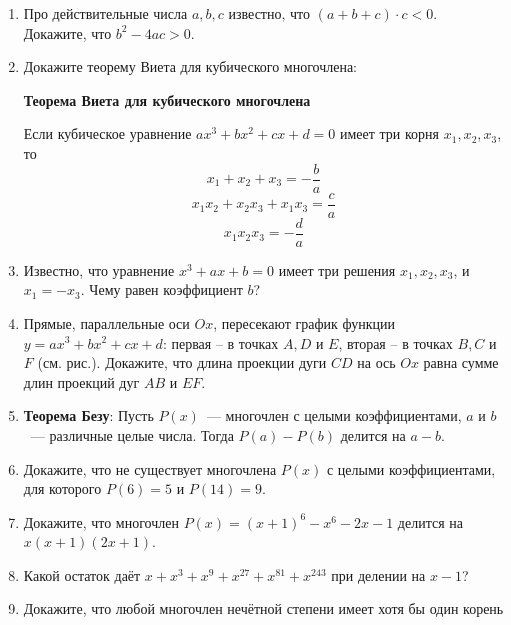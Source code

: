 \documentclass{article}
\begin{document}
\begin{enumerate}[label*=\protect\fbox{\arabic{enumi}}]
\item Про действительные числа $a, b, c$ известно, что $(a + b + c)\cdot c < 0$. Докажите, что $b^2 - 4ac>0$.

\newpage
\item Докажите теорему Виета для кубического многочлена:

\textbf{Теорема Виета для кубического многочлена} 

Если кубическое уравнение $ax^3 + bx^2 + cx + d = 0$ имеет три корня $x_1, x_2, x_3$, то $$x_1 + x_2 + x_3 = -\dfrac{b}{a}$$ $$x_1x_2  + x_2x_3 + x_1x_3 = \dfrac{c}{a}$$ $$x_1x_2x_3 = -\dfrac{d}{a}$$

\item Известно, что уравнение  $x^3 + ax + b = 0$  имеет три решения $x_1, x_2, x_3$, и $x_1 = -x_3$. Чему равен коэффициент $b$?

\item Прямые, параллельные оси $Ox$, пересекают график функции  $y = ax^3 + bx^2 + cx + d$:  первая – в точках $A, D$ и $E$, вторая – в точках $B, C$ и $F$ (см. рис.). Докажите, что длина проекции дуги $CD$ на ось $Ox$ равна сумме длин проекций дуг $AB$ и $EF$.
\begin{figure}[h]
	\label{fig:image}
\end{figure}

\item \textbf{Теорема Безу}: Пусть $P(x)$~--- многочлен с целыми коэффициентами, $a$ и $b$~--- различные целые числа. Тогда $P (a) - P (b)$ делится на $a - b$.

\item Докажите, что не существует многочлена $P(x)$ с целыми коэффициентами, для которого $P(6) = 5$ и $P(14) = 9$.

\item Докажите, что многочлен $P(x) = (x + 1)^6 - x^6- 2x - 1$ делится на $x(x+1)(2x+1)$.

\item Какой остаток даёт $x+x^{3} +x^{9} +x^{27} +x^{81} +x^{243}$ при делении на $x-1$?

\item Докажите, что любой многочлен нечётной степени имеет хотя бы один корень


\end{enumerate}
\end{document}
